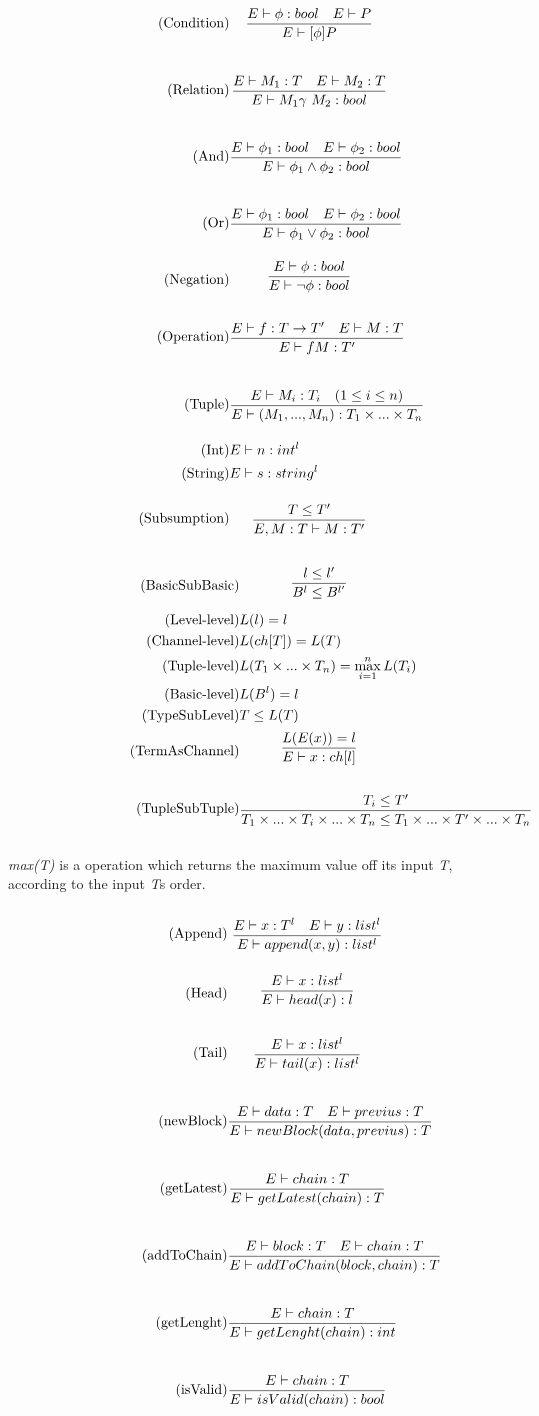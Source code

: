 \begin{align}
\tag{Condition} &\infrule{E\vdash \phi:bool\quad E\vdash P}{E \vdash [\phi] P}\\
\tag{Relation} &\infrule{E\vdash M_1:T \quad E\vdash M_2:T}{E\vdash M_1 \gamma\ M_2:bool}\\
\tag{And} &\infrule{E\vdash \phi _1:bool \quad E\vdash \phi _2:bool}{E\vdash \phi _1 \land \phi _2:bool}\\
\tag{Or} &\infrule{E\vdash \phi _1:bool \quad E\vdash \phi _2:bool}{E\vdash \phi _1 \lor \phi _2:bool}\\
\tag{Negation} &\infrule{E\vdash \phi :bool }{E\vdash \neg \phi :bool}\\
\tag{Operation} &\infrule{E\vdash f:T\ra T'\quad E\vdash M:T}{E\vdash fM:T'}\\
\tag{Tuple} &\infrule{E\vdash M_i:T_i \quad (1\leq i\leq n)}{E\vdash (M_1,...,M_n):T_1\times...\times T_n}\\
\tag{Int} &E\vdash n: int^l\\
\tag{String} &E\vdash s:string^l\\
\tag{Subsumption} &\infrule{T\leq T'}{E, M:T\vdash M:T'}
\end{align}

\begin{align}
\tag{BasicSubBasic} &\infrule{l\leq l'}{B^l\leq B^{l'}}\\
\tag{Level-level} &L(l)=l\\
\tag{Channel-level} &L(ch[T]) = L(T)\\
\tag{Tuple-level} &L(T_1\times...\times T_n)=\max_{i=1}^{n}{L(T_i)}\\
\tag{Basic-level} &L(B^l)=l\\
\tag{TypeSubLevel} &T\leq L(T)\\
\tag{TermAsChannel} &\infrule{L(E(x))=l}{E\vdash x:ch[l]}\\
\tag{TupleSubTuple} &\infrule{T_i\leq T'}{T_1\times...\times T_i\times...\times T_n\leq T_1\times...\times T'\times...\times T_n}
\end{align}

\textit{max(T)} is a operation which returns the maximum value off its input \textit{T}, according to the input \textit{T}s order.
\begin{align}
\tag{Append} &\infrule{E \vdash x:T^l \quad E \vdash y:list^l}{E \vdash append(x,y):list^l}\\
\tag{Head} &\infrule{E \vdash x:list^l}{E \vdash head(x):l}\\
\tag{Tail} &\infrule{E \vdash x:list^l}{E \vdash tail(x):list^l}\\
\tag{newBlock}& \infrule{E \vdash data:T \quad E \vdash previus : T}{E \vdash newBlock(data, previus) :T}\\
\tag{getLatest}& \infrule{E \vdash chain :T}{E \vdash getLatest(chain):T}\\
\tag{addToChain}& \infrule{E \vdash block:T \quad E \vdash chain:T}{E \vdash addToChain(block, chain):T}\\
\tag{getLenght}& \infrule{E \vdash chain:T}{E \vdash getLenght(chain):int}\\
\tag{isValid}& \infrule{E \vdash chain:T}{E \vdash isValid(chain):bool}
\end{align}

